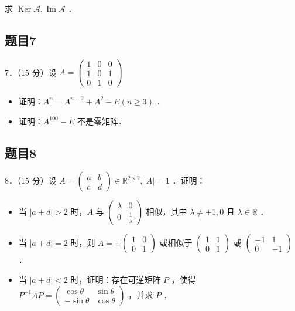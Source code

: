 \documentclass{article}
\begin{document}
求 \(\operatorname{Ker} \mathcal{A}, \operatorname{Im} \mathcal{A}\) ．

\subsection{题目7}
7．（15 分）设 \(A=\left(\begin{array}{lll}1 & 0 & 0 \\ 1 & 0 & 1 \\ 0 & 1 & 0\end{array}\right)\)

\begin{itemize}
  \item[（1）] 证明：\(A^{n}=A^{n-2}+A^{2}-E(n \geq 3)\) ．
  \item[（2）] 证明：\(A^{100}-E\) 不是零矩阵．
\end{itemize}

\subsection{题目8}
8．（15 分）设 \(A=\left(\begin{array}{ll}a & b \\ c & d\end{array}\right) \in \mathbb{R}^{2 \times 2},|A|=1\) ．证明：

\begin{itemize}
  \item[（1）] 当 \(|a+d|>2\) 时，\(A\) 与 \(\left(\begin{array}{cc}\lambda & 0 \\ 0 & \frac{1}{\lambda}\end{array}\right)\) 相似，其中 \(\lambda \neq \pm 1,0\) 且 \(\lambda \in \mathbb{R}\) ．
  \item[（2）] 当 \(|a+d|=2\) 时，则 \(A= \pm\left(\begin{array}{ll}1 & 0 \\ 0 & 1\end{array}\right)\) 或相似于 \(\left(\begin{array}{ll}1 & 1 \\ 0 & 1\end{array}\right)\) 或 \(\left(\begin{array}{cc}-1 & 1 \\ 0 & -1\end{array}\right)\) ．
  \item[（3）] 当 \(|a+d|<2\) 时，证明：存在可逆矩阵 \(P\) ，使得 \(P^{-1} A P=\left(\begin{array}{cc}\cos \theta & \sin \theta \\ -\sin \theta & \cos \theta\end{array}\right)\) ，并求 \(P\) ．
\end{itemize}
\end{document}
